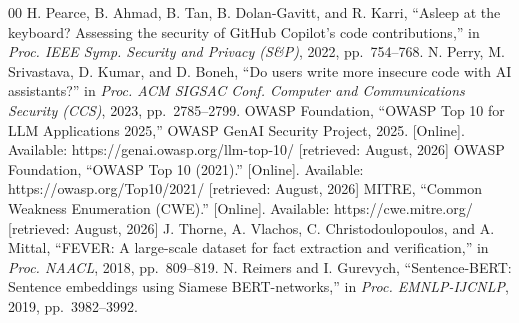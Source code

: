 \begin{thebibliography}{00}
 H. Pearce, B. Ahmad, B. Tan, B. Dolan-Gavitt, and R. Karri, ``Asleep at the keyboard? Assessing the security of GitHub Copilot's code contributions,'' in \emph{Proc. IEEE Symp. Security and Privacy (S\&P)}, 2022, pp.~754--768.
 N. Perry, M. Srivastava, D. Kumar, and D. Boneh, ``Do users write more insecure code with AI assistants?'' in \emph{Proc. ACM SIGSAC Conf. Computer and Communications Security (CCS)}, 2023, pp.~2785--2799.
 OWASP Foundation, ``OWASP Top 10 for LLM Applications 2025,'' OWASP GenAI Security Project, 2025. [Online]. Available: https://genai.owasp.org/llm-top-10/ [retrieved: August, 2026]
 OWASP Foundation, ``OWASP Top 10 (2021).'' [Online]. Available: https://owasp.org/Top10/2021/ [retrieved: August, 2026]
 MITRE, ``Common Weakness Enumeration (CWE).'' [Online]. Available: https://cwe.mitre.org/ [retrieved: August, 2026]
 J. Thorne, A. Vlachos, C. Christodoulopoulos, and A. Mittal, ``FEVER: A large-scale dataset for fact extraction and verification,'' in \emph{Proc. NAACL}, 2018, pp.~809--819.
 N. Reimers and I. Gurevych, ``Sentence-BERT: Sentence embeddings using Siamese BERT-networks,'' in \emph{Proc. EMNLP-IJCNLP}, 2019, pp.~3982--3992.
\end{thebibliography}
